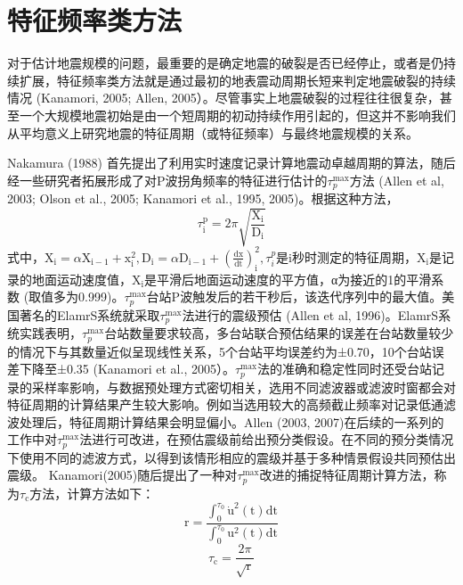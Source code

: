\section{特征频率类方法}
\indent 对于估计地震规模的问题，最重要的是确定地震的破裂是否已经停止，或者是仍持续扩展，特征频率类方法就是通过最初的地表震动周期长短来判定地震破裂的持续情况 (Kanamori, 2005; Allen, 2005）。尽管事实上地震破裂的过程往往很复杂，甚至一个大规模地震初始是由一个短周期的初动持续作用引起的，但这并不影响我们从平均意义上研究地震的特征周期（或特征频率）与最终地震规模的关系。

\indent Nakamura (1988) 首先提出了利用实时速度记录计算地震动卓越周期的算法，随后经一些研究者拓展形成了对P波拐角频率的特征进行估计的$\tau_{p}^{\max }$方法 (Allen et al, 2003; Olson et al., 2005; Kanamori et al., 1995, 2005)。根据这种方法，
\begin{equation}
\tau_{\mathrm{i}}^{\mathrm{p}}=2 \pi \sqrt{\frac{\mathrm{X}_{\mathrm{i}}}{\mathrm{D}_{\mathrm{i}}}}
\end{equation}
式中，$\mathrm{X}_{\mathrm{i}}=\alpha \mathrm{X}_{\mathrm{i}-1}+\mathrm{x}_{\mathrm{i}}^{2}, \mathrm{D}_{\mathrm{i}}=\alpha \mathrm{D}_{\mathrm{i}-1}+\left(\frac{\mathrm{dx}}{\mathrm{dt}}\right)_{\mathrm{i}}^{2}, \tau_{i}^{p}$是i秒时测定的特征周期，$\mathrm{X}_{\mathrm{i}}$是记录的地面运动速度值，$\mathrm{X}_{\mathrm{i}}$是平滑后地面运动速度的平方值，α为接近的1的平滑系数 (取值多为0.999)。$\tau_{p}^{\max}$台站P波触发后的若干秒后，该迭代序列中的最大值。美国著名的ElamrS系统就采取$\tau_{p}^{\max }$法进行的震级预估 (Allen et al, 1996)。ElamrS系统实践表明，$\tau_{p}^{\max}$台站数量要求较高，多台站联合预估结果的误差在台站数量较少的情况下与其数量近似呈现线性关系，5个台站平均误差约为±0.70，10个台站误差下降至±0.35 (Kanamori et al., 2005）。$\tau_{p}^{\max}$法的准确和稳定性同时还受台站记录的采样率影响，与数据预处理方式密切相关，选用不同滤波器或滤波时窗都会对特征周期的计算结果产生较大影响。例如当选用较大的高频截止频率对记录低通滤波处理后，特征周期计算结果会明显偏小。Allen (2003, 2007)在后续的一系列的工作中对$\tau_{p}^{\max}$法进行可改进，在预估震级前给出预分类假设。在不同的预分类情况下使用不同的滤波方式，以得到该情形相应的震级并基于多种情景假设共同预估出震级。
\indent Kanamori(2005)随后提出了一种对$\tau_{p}^{\max}$改进的捕捉特征周期计算方法，称为$\tau_{\mathrm{c}}$方法，计算方法如下：
\begin{equation}
\mathrm{r}=\frac{\int_{0}^{\tau_{0}} \dot{\mathrm{u}}^{2}(\mathrm{t}) \mathrm{dt}}{\int_{0}^{\tau_{0}} \mathrm{u}^{2}(\mathrm{t}) \mathrm{dt}}
\end{equation}
\begin{equation}
\tau_{\mathrm{c}}=\frac{2 \pi}{\sqrt{\mathrm{r}}}
\end{equation}
